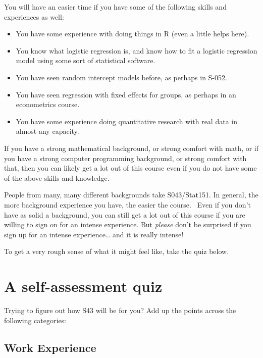 \documentclass[
  letterpaper,
  DIV=11,
  numbers=noendperiod]{scrreprt}
\begin{document}
You will have an easier time if you have some of the following skills
and experiences as well:

\begin{itemize}
\item
  You have some experience with doing things in R (even a little helps
  here).
\item
  You know what logistic regression is, and know how to fit a logistic
  regression model using some sort of statistical software.
\item
  You have seen random intercept models before, as perhaps in S-052.
\item
  You have seen regression with fixed effects for groups, as perhaps in
  an econometrics course.
\item
  You have some experience doing quantitative research with real data in
  almost any capacity.
\end{itemize}

If you have a strong mathematical background, or strong comfort with
math, or if you have a strong computer programming background, or strong
comfort with that, then you can likely get a lot out of this course even
if you do not have some of the above skills and knowledge.

People from many, many different backgrounds take S043/Stat151. In
general, the more background experience you have, the easier the
course.~ Even if you don't have as solid a background, you can still get
a lot out of this course if you are willing to sign on for an intense
experience. But \emph{please} don't be surprised if you sign up for an
intense experience\ldots{} and it is really intense!

To get a very rough sense of what it might feel like, take the quiz
below.

\hypertarget{a-self-assessment-quiz}{%
\section*{A self-assessment quiz}\label{a-self-assessment-quiz}}


Trying to figure out how S43 will be for you? \hspace{0pt}Add up the
points across the following categories:

\hypertarget{work-experience}{%
\subsection*{\texorpdfstring{\textbf{Work
Experience}}{Work Experience}}\label{work-experience}}
\end{document}
